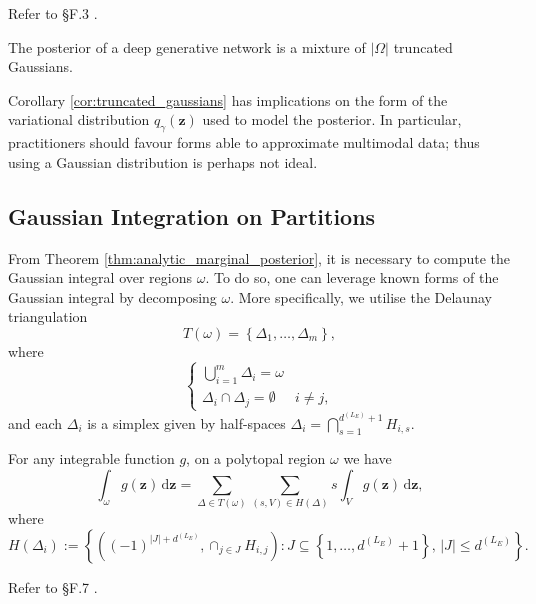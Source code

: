 \begin{tproof}
    Refer to \S F.3 \citet{balestrieroAnalyticalProbabilityDistributions2020}.
\end{tproof}

\begin{corollary}\label{cor:truncated_gaussians}
    The posterior of a deep generative network is a mixture of $\vert\Omega\vert$ truncated Gaussians.
\end{corollary}

\begin{remark}
    Corollary \ref{cor:truncated_gaussians} has implications on the form of the variational distribution $q_{\gamma}(\mathbf{z})$ used to model the posterior. In particular, practitioners should favour forms able to approximate multimodal data; thus using a Gaussian distribution is perhaps not ideal.
\end{remark}

\subsection{Gaussian Integration on Partitions}

From Theorem \ref{thm:analytic_marginal_posterior}, it is necessary to compute the Gaussian integral over regions $\omega$. To do so, one can leverage known forms of the Gaussian integral by decomposing $\omega$. More specifically, we utilise the Delaunay triangulation $$T(\omega)=\left\{\Delta_1,\dots,\Delta_m\right\},$$where $$\begin{cases}\bigcup_{i=1}^m\Delta_i=\omega\\\Delta_i\cap\Delta_j=\emptyset&i\neq j,\end{cases}$$and each $\Delta_i$ is a simplex given by half-spaces $\Delta_i=\bigcap_{s=1}^{d^{\left(L_E\right)}+1}H_{i,s}$.

\begin{lemma}\label{lem:integral_over_simplices}
    For any integrable function $g$, on a polytopal region $\omega$ we have $$\int_{\omega}g(\mathbf{z})\,\mathrm{d}\mathbf{z}=\sum_{\Delta\in T(\omega)}\sum_{(s,V)\in H(\Delta)}s\int_Vg(\mathbf{z})\,\mathrm{d}\mathbf{z},$$where $$H\left(\Delta_i\right):=\left\{\left((-1)^{\vert J\vert+d^{\left(L_E\right)}},\cap_{j\in J}H_{i,j}\right):J\subseteq\left\{1,\dots,d^{\left(L_E\right)}+1\right\},\,\vert J\vert\leq d^{\left(L_E\right)}\right\}.$$
\end{lemma}

\begin{tproof}
    Refer to \S F.7 \citet{balestrieroAnalyticalProbabilityDistributions2020}.
\end{tproof}

